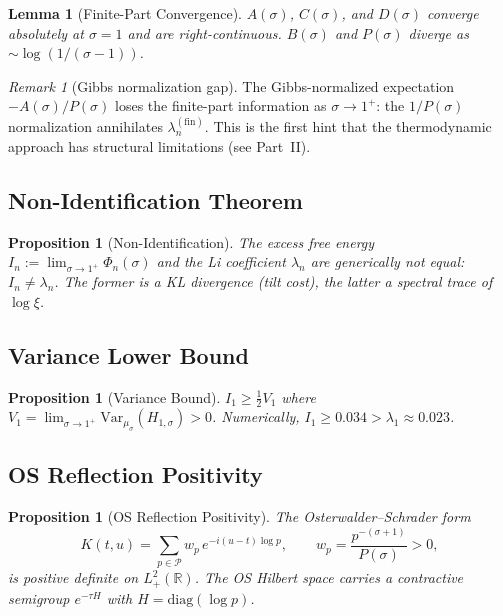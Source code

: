 \documentclass[12pt,a4paper]{article}
\newtheorem{lemma}[theorem]{Lemma}
\newtheorem{proposition}[theorem]{Proposition}
\theoremstyle{definition}
\theoremstyle{remark}
\newtheorem{remark}[theorem]{Remark}
\newcommand{\muG}{\mu_\sigma}
\newcommand{\PP}{\mathcal{P}}
\begin{document}
\begin{lemma}[Finite-Part Convergence]
\label{lem:convergence}
$A(\sigma)$, $C(\sigma)$, and $D(\sigma)$ converge absolutely at $\sigma = 1$ and are right-continuous. $B(\sigma)$ and $P(\sigma)$ diverge as $\sim\log(1/(\sigma-1))$.
\end{lemma}

\begin{remark}[Gibbs normalization gap]
The Gibbs-normalized expectation $-A(\sigma)/P(\sigma)$ loses the finite-part information as $\sigma \to 1^+$: the $1/P(\sigma)$ normalization annihilates $\lambda_n^{(\mathrm{fin})}$. This is the first hint that the thermodynamic approach has structural limitations (see Part~II).
\end{remark}

\subsection{Non-Identification Theorem}

\begin{proposition}[Non-Identification]
\label{prop:non-ident}
The excess free energy $I_n := \lim_{\sigma \to 1^+}\Phi_n(\sigma)$ and the Li coefficient $\lambda_n$ are generically \emph{not} equal: $I_n \neq \lambda_n$. The former is a KL divergence (tilt cost), the latter a spectral trace of $\log\xi$.
\end{proposition}

\subsection{Variance Lower Bound}

\begin{proposition}[Variance Bound]
\label{prop:variance}
$I_1 \geq \frac{1}{2}V_1$ where $V_1 = \lim_{\sigma \to 1^+}\mathrm{Var}_{\muG}(H_{1,\sigma}) > 0$. Numerically, $I_1 \geq 0.034 > \lambda_1 \approx 0.023$.
\end{proposition}

\subsection{OS Reflection Positivity}

\begin{proposition}[OS Reflection Positivity]
\label{prop:os}
The Osterwalder--Schrader form
\[
K(t,u) = \sum_{p \in \PP} w_p\,e^{-i(u-t)\log p}, \qquad w_p = \frac{p^{-(\sigma+1)}}{P(\sigma)} > 0,
\]
is positive definite on $L^2_+(\mathbb{R})$. The OS Hilbert space carries a contractive semigroup $e^{-\tau H}$ with $H = \mathrm{diag}(\log p)$.
\end{proposition}
\end{document}

